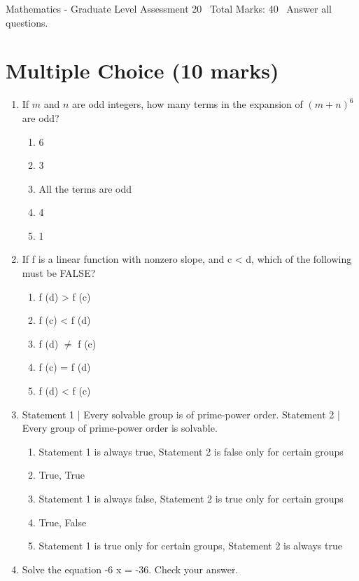 \documentclass[12pt]{article}
\begin{document}
\begin{center}
Mathematics - Graduate Level Assessment 20 \
Total Marks: 40 \
Answer all questions.
\end{center}

\section*{Multiple Choice (10 marks)}
\begin{enumerate}[label=\arabic*.]
\item If $m$ and $n$ are odd integers, how many terms in the expansion of $(m+n)^6$ are odd?
\begin{enumerate}[label=(\alph*)]
    \item 6
    \item 3
    \item All the terms are odd
    \item 4
    \item 1
\end{enumerate}
\item If f is a linear function with nonzero slope, and c \textless{} d, which of the following must be FALSE?
\begin{enumerate}[label=(\alph*)]
    \item f (d) \textgreater{} f (c)
    \item f (c) \textless{} f (d)
    \item f (d) \ensuremath{\neq} f (c)
    \item f (c) = f (d)
    \item f (d) \textless{} f (c)
\end{enumerate}
\item Statement 1 | Every solvable group is of prime-power order. Statement 2 | Every group of prime-power order is solvable.
\begin{enumerate}[label=(\alph*)]
    \item Statement 1 is always true, Statement 2 is false only for certain groups
    \item True, True
    \item Statement 1 is always false, Statement 2 is true only for certain groups
    \item True, False
    \item Statement 1 is true only for certain groups, Statement 2 is always true
\end{enumerate}
\item Solve the equation -6 x = -36. Check your answer.
\begin{enumerate}[label=(\alph*)]

\end{enumerate}
\end{enumerate}
\end{document}
